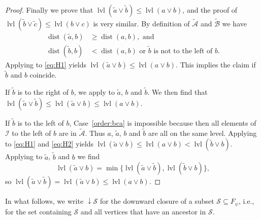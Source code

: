 \documentclass[a4paper]{amsart}
\theoremstyle{definition}
\theoremstyle{remark}
\numberwithin{equation}{theorem}
\newcommand{\dist}{\operatorname{dist}}
\newcommand{\level}{\operatorname{lvl}}
\newcommand{\psiforest}{F_\psi}
\begin{document}
\begin{proof}
    Finally we prove that $\level(\tilde a\vee\tilde b)\leq\level(a\vee b)$, and the proof of $\level(\tilde b\vee\tilde c)\leq\level(b\vee c)$ is very similar.  By definition of $\tilde{\mathcal A}$ and $\tilde{\mathcal B}$ we have
  \begin{align}
    \dist(\tilde a, b)&\geq\dist(a, b),\text{ and}\tag{d1}\label{eq:H1}\\
    \dist(\tilde b, b)&<\dist(a, b)\tag{d2}\label{eq:H2}\text{ or $\tilde b$ is not to the left of $b$.}
  \end{align}
  Applying  to \eqref{eq:H1} yields
  $\level(\tilde a\vee b)\leq\level(a\vee b)$.  This implies the
  claim if $\tilde b$ and $b$ coincide.

  If $\tilde b$ is to the right of $b$, we apply
   to $\tilde a$, $b$ and $\tilde b$.  We
  then find that
  $\level(\tilde a\vee\tilde b)\leq\level(\tilde a\vee
  b)\leq\level(a\vee b)$.

  If $\tilde b$ is to the left of $b$, Case~\ref{order:bca} is impossible
  because then all elements of $\mathcal I$ to the left of $b$ are in $ \tilde{ \mathcal A } $.  Thus $a$, $\tilde a$, $b$ and $\tilde b$ are all on the same level.  Applying
   to \eqref{eq:H1} and \eqref{eq:H2} yields
  $\level(\tilde a\vee b)\leq\level(a\vee b)<\level(\tilde b\vee b)$.
  Applying  to $\tilde a$, $\tilde b$ and
  $b$ we find
  \[
    \level(\tilde a\vee b) = \min\{\level(\tilde a\vee\tilde b),
    \level(\tilde b\vee b)\},
  \]
  so $ \level(\tilde a\vee\tilde b) = \level(\tilde a\vee b) \leq \level(a\vee b) $.
\end{proof}


    In what follows, we write $ \downarrow \! \mathcal S $ for the downward closure of a subset $\mathcal S \subseteq \psiforest$, i.e., for the set containing $ \mathcal S $ and all vertices that have an ancestor in $ \mathcal S $.
\end{document}

